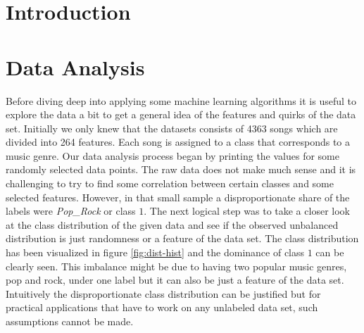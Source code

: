 \documentclass[fleqn,10pt]{SelfArx} %
\begin{document}
\boldmath

\flushbottom %

\maketitle %

\tableofcontents %

\thispagestyle{empty} %


\section{Introduction} %


\lipsum[1-3] %


\section{Data Analysis}

Before diving deep into applying some machine learning algorithms it is useful
to explore the data a bit to get a general idea of the features and quirks of
the data set. Initially we only knew that the datasets consists of 4363 songs
which are divided into 264 features. Each song is assigned to a class that
corresponds to a music genre. Our data analysis process began by printing the
values for some randomly selected data points. The raw data does not make much
sense and it is challenging to try to find some correlation between certain
classes and some selected features. However, in that small sample a
disproportionate share of the labels were \textit{Pop\_Rock} or class $1$. The
next logical step was to take a closer look at the class distribution of the
given data and see if the observed unbalanced distribution is just randomness or
a feature of the data set. The class distribution has been visualized in figure
\ref{fig:dist-hist} and the dominance of class $1$ can be clearly seen. This
imbalance might be due to having two popular music genres, pop and rock, under
one label but it can also be just a feature of the data set. Intuitively the
disproportionate class distribution can be justified but for practical
applications that have to work on any unlabeled data set, such assumptions
cannot be made.
\end{document}
